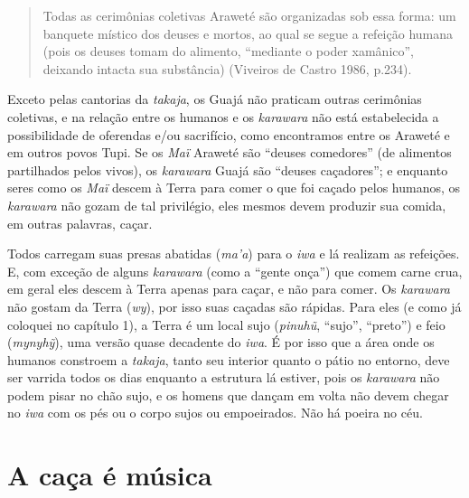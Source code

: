 \begin{quote}
Todas as cerimônias coletivas Araweté são organizadas sob essa forma: um
banquete místico dos deuses e mortos, ao qual se segue a refeição humana
(pois os deuses tomam do alimento, ``mediante o poder xamânico'', deixando
intacta sua substância) (Viveiros de Castro 1986, p.234).
\end{quote}

Exceto pelas cantorias da \emph{takaja}, os Guajá não praticam outras
cerimônias coletivas, e na relação entre os humanos e os \emph{karawara}
não está estabelecida a possibilidade de oferendas e/ou sacrifício, como
encontramos entre os Araweté e em outros povos Tupi. Se os \emph{Maï}
Araweté são ``deuses comedores'' (de alimentos partilhados pelos vivos),
os \emph{karawara} Guajá são ``deuses caçadores''; e enquanto seres como
os \emph{Maï} descem à Terra para comer o que foi caçado pelos humanos,
os \emph{karawara} não gozam de tal privilégio, eles mesmos devem
produzir sua comida, em outras palavras, caçar.

Todos carregam suas presas abatidas (\emph{ma'a}) para o \emph{iwa} e lá
realizam as refeições. E, com exceção de alguns \emph{karawara} (como a
``gente onça'') que comem carne crua, em geral eles descem à Terra
apenas para caçar, e não para comer. Os \emph{karawara} não gostam da
Terra (\emph{wy}), por isso suas caçadas são rápidas. Para eles (e como
já coloquei no capítulo 1), a Terra é um local sujo (\emph{pinuhũ},
``sujo'', ``preto'') e feio (\emph{mynyhỹ}), uma versão quase decadente do
\emph{iwa}. É por isso que a área onde os humanos constroem a
\emph{takaja}, tanto seu interior quanto o pátio no entorno, deve ser
varrida todos os dias enquanto a estrutura lá estiver, pois os
\emph{karawara} não podem pisar no chão sujo, e os homens que dançam em
volta não devem chegar no \emph{iwa} com os pés ou o corpo sujos ou
empoeirados. Não há poeira no céu.

\section{A caça é música}\label{a-cauxe7a-uxe9-muxfasica}


